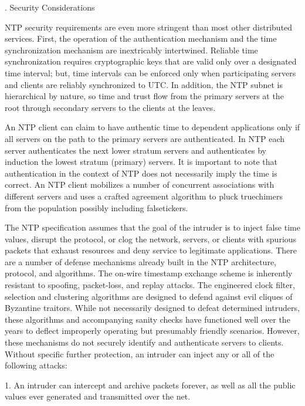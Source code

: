 .  Security Considerations

   NTP security requirements are even more stringent than most other
   distributed services.  First, the operation of the authentication
   mechanism and the time synchronization mechanism are inextricably
   intertwined.  Reliable time synchronization requires cryptographic
   keys that are valid only over a designated time interval; but, time
   intervals can be enforced only when participating servers and clients
      are reliably synchronized to UTC.  In addition, the NTP subnet is
   hierarchical by nature, so time and trust flow from the primary
   servers at the root through secondary servers to the clients at the
   leaves.

   An NTP client can claim to have authentic time to dependent
   applications only if all servers on the path to the primary servers
   are authenticated.  In NTP each server authenticates the next lower
   stratum servers and authenticates by induction the lowest stratum
   (primary) servers.  It is important to note that authentication in
   the context of NTP does not necessarily imply the time is correct.
   An NTP client mobilizes a number of concurrent associations with
   different servers and uses a crafted agreement algorithm to pluck
   truechimers from the population possibly including falsetickers.

   The NTP specification assumes that the goal of the intruder is to
   inject false time values, disrupt the protocol, or clog the network,
   servers, or clients with spurious packets that exhaust resources and
   deny service to legitimate applications.  There are a number of
   defense mechanisms already built in the NTP architecture, protocol,
   and algorithms.  The on-wire timestamp exchange scheme is inherently
   resistant to spoofing, packet-loss, and replay attacks.  The
   engineered clock filter, selection and clustering algorithms are
   designed to defend against evil cliques of Byzantine traitors.  While
   not necessarily designed to defeat determined intruders, these
   algorithms and accompanying sanity checks have functioned well over
   the years to deflect improperly operating but presumably friendly
   scenarios.  However, these mechanisms do not securely identify and
   authenticate servers to clients.  Without specific further
   protection, an intruder can inject any or all of the following
   attacks:

   1.  An intruder can intercept and archive packets forever, as well as
       all the public values ever generated and transmitted over the
       net.

